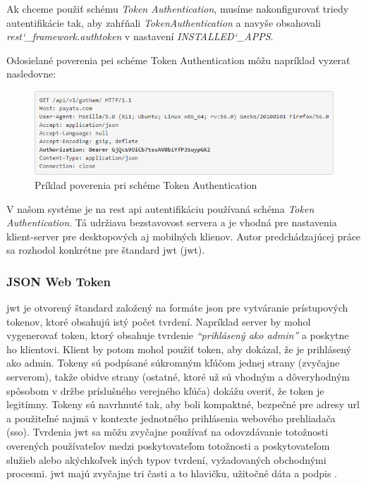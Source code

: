 Ak chceme použiť schému \textit{Token Authentication}, musíme nakonfigurovať triedy autentifikácie tak,
aby zahŕňali \textit{TokenAuthentication} a navyše obsahovali \\
\textit{rest\char`_framework.authtoken} v nastavení \textit{INSTALLED\char`_APPS}.

Odosielané poverenia pei schéme Token Authentication môžu napríklad vyzerať nasledovne:
\begin{figure}[ht]
  \centering
  \includegraphics[width=1\columnwidth]{img/auth_token.png}
  \caption{\label{fig:auth_token} Príklad poverenia pri schéme Token Authentication \cite{payatu}}
\end{figure}

V našom systéme je na \acrshort{rest} \acrshort{api} autentifikáciu používaná schéma \textit{Token Authentication}.
Tá udržiava bezstavovost servera a je vhodná pre nastavenia klient-server pre desktopových
aj mobilných klienov. Autor predchádzajúcej práce \cite{racak} sa rozhodol konkrétne pre štandard
\acrshort{jwt} (\acrlong{jwt}).

\subsubsection{JSON Web Token}
\label{subsubsec:json_web_token}

\acrlong{jwt} je otvorený štandard založený na formáte \acrshort{json} pre vytváranie prístupových
tokenov, ktoré obsahujú istý počet tvrdení. Napríklad server by mohol vygenerovať token, ktorý
obsahuje tvrdenie \textit{``prihlásený ako admin''} a poskytne ho klientovi. Klient by potom mohol
použiť token, aby dokázal, že je prihlásený ako admin. Tokeny sú podpísané súkromným kľúčom
jednej strany (zvyčajne serverom), takže obidve strany (ostatné, ktoré už sú vhodným
a dôveryhodným spôsobom v držbe príslušného verejného kľúča) dokážu overiť, že token je
legitímny. Tokeny sú navrhnuté tak, aby boli kompaktné, bezpečné pre adresy \acrshort{url} a použiteľné
najmä v kontexte jednotného prihlásenia webového prehliadača (\acrshort{sso}). Tvrdenia \acrshort{jwt} sa môžu 
zvyčajne používať na odovzdávanie totožnosti overených používateľov medzi poskytovateľom
totožnosti a poskytovateľom služieb alebo akýchkoľvek iných typov tvrdení, vyžadovaných
obchodnými procesmi. \acrshort{jwt} majú zvyčajne tri časti a to hlavičku, užitočné dáta a podpis \cite{jwt_io}.

